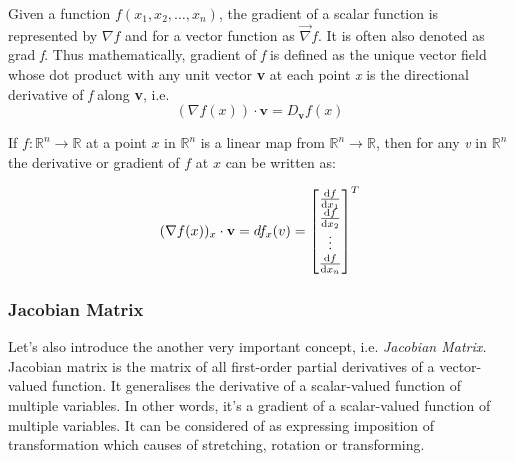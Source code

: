 Given a function $f(x_{1}, x_{2}, \ldots, x_{n}) $, the gradient of a scalar function is represented by $ \nabla f $ and for a vector function as $ \vec \nabla f$. It is often also denoted as grad \textit{f}. Thus mathematically, gradient of \textit{f} is defined as the unique vector field whose dot product with any unit vector \textbf{v} at each point \textit{x} is the directional derivative of \textit{f} along \textbf{v}, i.e.
\begin{equation}
	(\nabla f(x))\cdot \textbf{v} = D_{\textbf{v}} f(x)
\end{equation}

If $ f: \mathbb{R}^{n} \rightarrow \mathbb{R} $ at a point $ x $ in $\mathbb{R}^{n} $ is a linear map from $\mathbb{R}^{n} \rightarrow \mathbb{R} $, then for any \textit{v} in $\mathbb{R}^{n}$ the derivative or gradient of $ f$ at $ x$ can be written as:

\begin{equation}
	(\nabla f(x))_{x}\cdot \textbf{v} = df_{x}(v) = 
	\begin{bmatrix}
	\frac{\mathop{}\!\mathrm{d} f}{\mathop{}\!\mathrm{d} x_{1}} \\
	\frac{\mathop{}\!\mathrm{d} f}{\mathop{}\!\mathrm{d} x_{2}} \\
	\vdots\\
	\frac{\mathop{}\!\mathrm{d} f}{\mathop{}\!\mathrm{d} x_{n}}
	\end{bmatrix}^{T}
\end{equation}

\subsubsection{Jacobian Matrix} Let's also introduce the another very important concept, i.e. \textit{Jacobian Matrix.} Jacobian matrix is the matrix of all first-order partial derivatives of a vector-valued function. It generalises the derivative of a scalar-valued function of multiple variables. In other words, it's a gradient of a scalar-valued function of multiple variables. It can be considered of as expressing imposition of transformation which causes of stretching, rotation or transforming.

